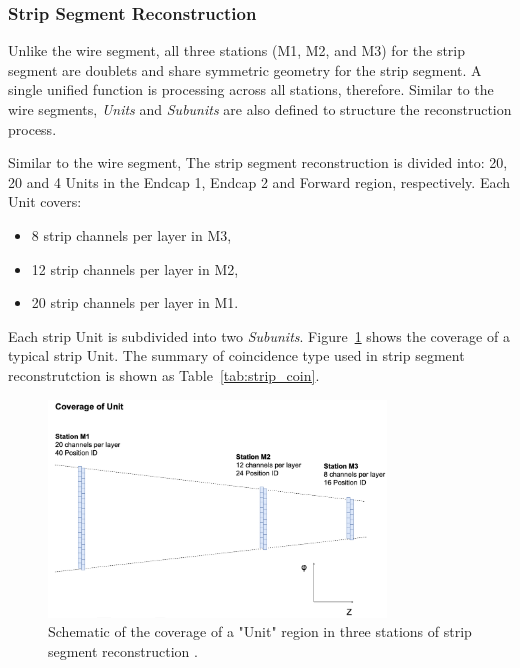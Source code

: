 \subsubsection{Strip Segment Reconstruction}

Unlike the wire segment, all three stations (M1, M2, and M3) for the strip segment are doublets and share symmetric geometry for the strip segment. A single unified function is processing across all stations, therefore. Similar to the wire segments, \textit{Units} and \textit{Subunits} are also defined to structure the reconstruction process.

Similar to the wire segment, The strip segment reconstruction is divided into: 20, 20 and 4 Units in the Endcap 1, Endcap 2 and Forward region, respectively. Each Unit covers:
\begin{itemize}
  \item 8 strip channels per layer in M3,
  \item 12 strip channels per layer in M2,
  \item 20 strip channels per layer in M1.
\end{itemize}
Each strip Unit is subdivided into two \textit{Subunits}. Figure~\ref{fig:strip_unit} shows the coverage of a typical strip Unit. The summary of coincidence type used in strip segment reconstrutction is shown as Table~\ref{tab:strip_coin}.


\begin{figure}[htbp]
  \centering
  \includegraphics[width=0.8\textwidth]{figs/chapter5/strip_unit.png}
  \caption{Schematic of the coverage of a "Unit" region in three stations of strip segment reconstruction \cite{EndcapSLPDR}.}
  \label{fig:strip_unit}
\end{figure}

